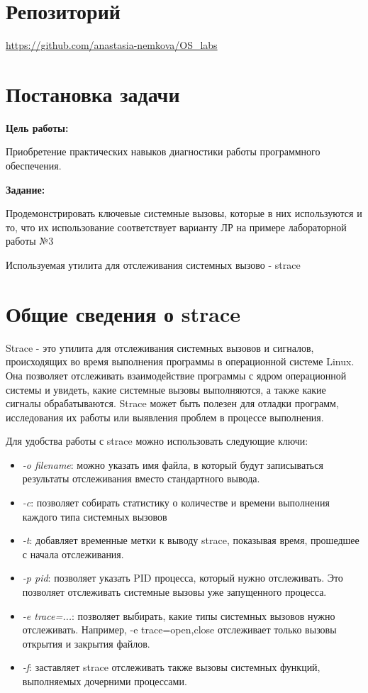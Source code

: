 \documentclass[a4paper, 14pt]{article}
\begin{document}
\section*{Репозиторий}   
\vspace{2ex}
\url{https://github.com/anastasia-nemkova/OS_labs}

\section*{Постановка задачи}   
\textbf{Цель работы:}
\vspace{2ex}

Приобретение практических навыков диагностики работы программного обеспечения.

\vspace{4ex}
\textbf{Задание:}

Продемонстрировать ключевые системные вызовы, которые в них используются и то, что их использование соответствует варианту ЛР на примере лабораторной работы №3

Используемая утилита для отслеживания системных вызово - strace

\section*{Общие сведения о strace}

Strace - это утилита для отслеживания системных вызовов и сигналов, происходящих во время выполнения программы в операционной системе Linux. Она позволяет отслеживать взаимодействие программы с ядром операционной системы и увидеть, какие системные вызовы выполняются, а также какие сигналы обрабатываются. Strace может быть полезен для отладки программ, исследования их работы или выявления проблем в процессе выполнения.

Для удобства работы с strace можно использовать следующие ключи:

\begin{itemize}
    \item \textit{-o filename}: можно указать имя файла, в который будут записываться результаты отслеживания вместо стандартного вывода.
    \item \textit{-c}: позволяет собирать статистику о количестве и времени выполнения каждого типа системных вызовов
    \item \textit{-t}: добавляет временные метки к выводу strace, показывая время, прошедшее с начала отслеживания.
    \item \textit{-p pid}: позволяет указать PID процесса, который нужно отслеживать. Это позволяет отслеживать системные вызовы уже запущенного процесса.
    \item \textit{-e trace=...}: позволяет выбирать, какие типы системных вызовов нужно отслеживать. Например, -e trace=open,close отслеживает только вызовы открытия и закрытия файлов.
    \item \textit{-f}: заставляет strace отслеживать также вызовы системных функций, выполняемых дочерними процессами.
\end{itemize}
\end{document}

